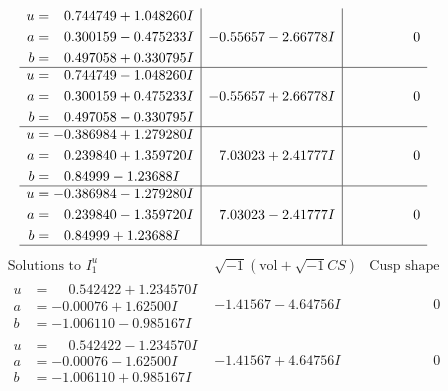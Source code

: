 \documentclass[1p]{elsarticle_modified}
\theoremstyle{definition}
\newcommand{\I}{\sqrt{-1}}
\begin{document}
$$\begin{array}{c|c|c}
\begin{aligned}
u &= \phantom{-}0.744749 + 1.048260 I \\
a &= \phantom{-}0.300159 - 0.475233 I \\
b &= \phantom{-}0.497058 + 0.330795 I\end{aligned}
 & -0.55657 - 2.66778 I & \phantom{-0.000000 } 0 \\ \hline\begin{aligned}
u &= \phantom{-}0.744749 - 1.048260 I \\
a &= \phantom{-}0.300159 + 0.475233 I \\
b &= \phantom{-}0.497058 - 0.330795 I\end{aligned}
 & -0.55657 + 2.66778 I & \phantom{-0.000000 } 0 \\ \hline\begin{aligned}
u &= -0.386984 + 1.279280 I \\
a &= \phantom{-}0.239840 + 1.359720 I \\
b &= \phantom{-}0.84999 - 1.23688 I\end{aligned}
 & \phantom{-}7.03023 + 2.41777 I & \phantom{-0.000000 } 0 \\ \hline\begin{aligned}
u &= -0.386984 - 1.279280 I \\
a &= \phantom{-}0.239840 - 1.359720 I \\
b &= \phantom{-}0.84999 + 1.23688 I\end{aligned}
 & \phantom{-}7.03023 - 2.41777 I & \phantom{-0.000000 } 0\\
 \hline 
 \end{array}$$\newpage$$\begin{array}{c|c|c}  
\text{Solutions to }I^u_{1}& \I (\text{vol} + \sqrt{-1}CS) & \text{Cusp shape}\\
 \hline 
\begin{aligned}
u &= \phantom{-}0.542422 + 1.234570 I \\
a &= -0.00076 + 1.62500 I \\
b &= -1.006110 - 0.985167 I\end{aligned}
 & -1.41567 - 4.64756 I & \phantom{-0.000000 } 0 \\ \hline\begin{aligned}
u &= \phantom{-}0.542422 - 1.234570 I \\
a &= -0.00076 - 1.62500 I \\
b &= -1.006110 + 0.985167 I\end{aligned}
 & -1.41567 + 4.64756 I & \phantom{-0.000000 } 0 \\ \hline\begin{aligned}

\end{aligned}
\end{array}$$
\end{document}
